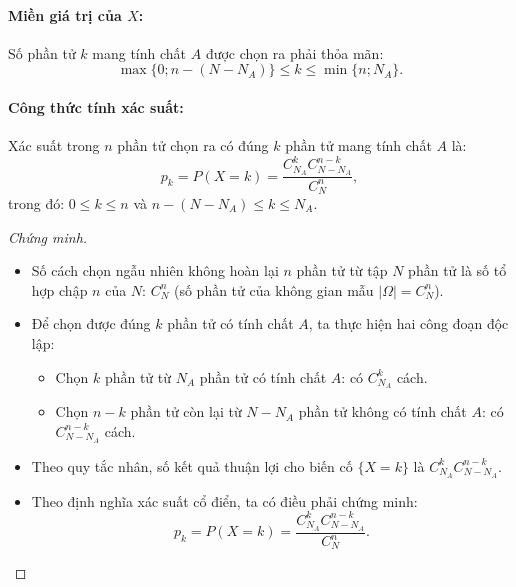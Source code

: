 \paragraph{Miền giá trị của $X$:}
Số phần tử $k$ mang tính chất $A$ được chọn ra phải thỏa mãn:
\[
\max\{0; n - (N - N_A)\} \le k \le \min\{n; N_A\}.
\]

\paragraph{Công thức tính xác suất:}
Xác suất trong $n$ phần tử chọn ra có đúng $k$ phần tử mang tính chất $A$ là:
\[
p_k = P(X = k) = \frac{C_{N_A}^k C_{N - N_A}^{n - k}}{C_N^n},
\]
trong đó: $0 \le k \le n$ và $n - (N - N_A) \le k \le N_A$.

\begin{proof}[Chứng minh]
\begin{itemize}
    \item Số cách chọn ngẫu nhiên không hoàn lại $n$ phần tử từ tập $N$ phần tử là số tổ hợp chập $n$ của $N$: $C_N^n$ (số phần tử của không gian mẫu $|\Omega| = C_N^n$).
    \item Để chọn được đúng $k$ phần tử có tính chất $A$, ta thực hiện hai công đoạn độc lập:
    \begin{itemize}
        \item Chọn $k$ phần tử từ $N_A$ phần tử có tính chất $A$: có $C_{N_A}^k$ cách.
        \item Chọn $n - k$ phần tử còn lại từ $N - N_A$ phần tử không có tính chất $A$: có $C_{N - N_A}^{n - k}$ cách.
    \end{itemize}
    \item Theo quy tắc nhân, số kết quả thuận lợi cho biến cố $\{X = k\}$ là $C_{N_A}^k C_{N - N_A}^{n - k}$.
    \item Theo định nghĩa xác suất cổ điển, ta có điều phải chứng minh:
    \[
    p_k = P(X = k) = \frac{C_{N_A}^k C_{N - N_A}^{n - k}}{C_N^n}.
    \]
\end{itemize}
\end{proof}

